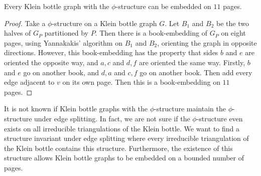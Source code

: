 \begin{proposition}
    Every Klein bottle graph with the $\phi$-structure can be embedded on $11$ pages. 
\end{proposition}
\begin{proof}
    Take a $\phi$-structure on a Klein bottle graph $G$. Let $B_1$ and $B_2$ be the two halves of $G_P$ partitioned by $P$. Then there is a book-embedding of $G_P$ on eight pages, using Yannakakis' algorithm on $B_1$ and $B_2$, orienting the graph in opposite directions. However, this book-embedding has the property that sides $b$ and $e$ are oriented the opposite way, and $a, c$ and $d, f$ are oriented the same way. Firstly, $b$ and $e$ go on another book, and $d, a$ and $c, f$ go on another book. Then add every edge adjacent to $v$ on its own page. Then this is a book-embedding on $11$ pages. 
\end{proof}

It is not known if Klein bottle graphs with the $\phi$-structure maintain the $\phi$-structure under edge splitting. In fact, we are not sure if the $\phi$-structure even exists on all irreducible triangulations of the Klein bottle. We want to find a structure invariant under edge splitting where every irreducible triangulation of the Klein bottle contains this structure. Furthermore, the existence of this structure allows Klein bottle graphs to be embedded on a bounded number of pages.
